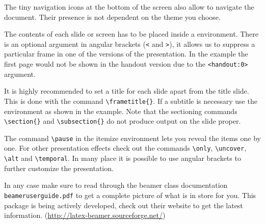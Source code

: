 The tiny navigation icons at the bottom of the screen also allow to
navigate the document. Their presence is not dependent on the theme
you choose.

The contents of each slide or screen has to be placed inside a
 environment. There is an optional argument in angular
brackets (\verb|<| and \verb|>|), it allows us to suppress a particular
frame in one of the versions of the presentation. In the example the
first page would not be shown in the handout version due to the
\verb|<handout:0>| argument.

It is highly recommended to set a title for each slide apart from the
title slide. This is done with the command \verb|\frametitle{}|. If a
subtitle is necessary use the  environment as shown
in the example. Note that the sectioning commands \verb|\section{}|
and \verb|\subsection{}| do not produce output on the slide proper.

The command \verb|\pause| in the itemize environment lets you reveal
the items one by one. For other presentation effects check out the
commands \verb|\only|, \verb|\uncover|, \verb|\alt| and
\verb|\temporal|. In many place it is possible to use angular brackets to
further customize the presentation.

In any case make sure to read through the beamer class documentation
\texttt{beameruserguide.pdf} to get a complete picture of what is in
store for you. This package is being actively developed, check out their website
to get the latest information. (\href{http://latex-beamer.sourceforge.net/}{http://latex-beamer.sourceforge.net/})



